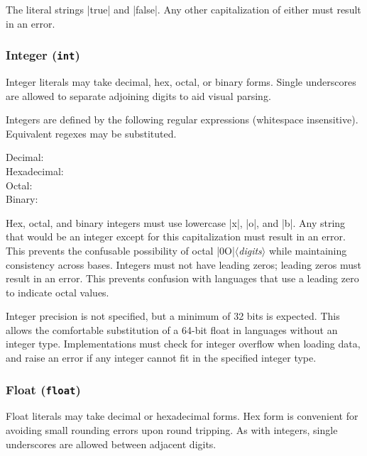 \documentclass[11pt]{article}
\newcommand{\vmeta}[1]{{\color{DarkRed}\ensuremath{\langle}\textit{#1}\ensuremath{\rangle}}}
\newcommand{\lit}[1]{\texttt{\color{DarkRed}\detokenize{#1}}}
\begin{document}
The literal strings |true| and |false|.  Any other capitalization of either must result in an error.


\subsubsection{Integer (\texttt{int})}

Integer literals may take decimal, hex, octal, or binary forms.  Single underscores are allowed to separate adjoining digits to aid visual parsing.

Integers are defined by the following regular expressions (whitespace insensitive).  Equivalent regexes may be substituted.
\begin{description}
\item[Decimal:]  \lit{[+-]?[1-9](?:_[0-9]|[0-9])*$ | [+-]?0$}
\item[Hexadecimal:]  \lit{[+-]?0x[0-9a-fA-F](?:_[0-9a-fA-F]|[0-9a-fA-F])*$}
\item[Octal:]  \lit{[+-]?0o[0-7](?:_[0-7]|[0-7])*$}
\item[Binary:]  \lit{[+-]?0b[01](?:_[01]|[01])*$}
\end{description} %
Hex, octal, and binary integers must use lowercase |x|, |o|, and |b|.  Any string that would be an integer except for this capitalization must result in an error.  This prevents the confusable possibility of octal |0O|\vmeta{digits} while maintaining consistency across bases.  Integers must not have leading zeros; leading zeros must result in an error.  This prevents confusion with languages that use a leading zero to indicate octal values.

Integer precision is not specified, but a minimum of 32 bits is expected.  This allows the comfortable substitution of a 64-bit float in languages without an integer type.  Implementations must check for integer overflow when loading data, and raise an error if any integer cannot fit in the specified integer type.



\subsubsection{Float (\texttt{float})}

Float literals may take decimal or hexadecimal forms.  Hex form is convenient for avoiding small rounding errors upon round tripping.  As with integers, single underscores are allowed between adjacent digits.
\end{document}
